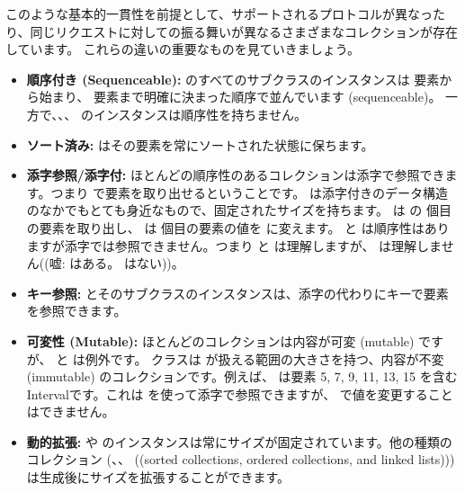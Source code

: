 \documentclass[a4paper,10pt,twoside]{book}
\begin{document}
このような基本的一貫性を前提として、サポートされるプロトコルが異なったり、同じリクエストに対しての振る舞いが異なるさまざまなコレクションが存在しています。
これらの違いの重要なものを見ていきましょう。

\begin{itemize}
  \item {\bf 順序付き (Sequenceable):}
   のすべてのサブクラスのインスタンスは  要素から始まり、 要素まで明確に決まった順序で並んでいます (sequenceable)。
  一方で、\mbox{、}\mbox{、} のインスタンスは順序性を持ちません。

  \item {\bf ソート済み:}
   はその要素を常にソートされた状態に保ちます。

  \item {\bf 添字参照/添字付:}
        ほとんどの順序性のあるコレクションは添字で参照できます。つまり  で要素を取り出せるということです。
         は添字付きのデータ構造のなかでもとても身近なもので、固定されたサイズを持ちます。 は  の  個目の要素を取り出し、 は  個目の要素の値を  に変えます。
         と  は順序性はありますが添字では参照できません。つまり  と  は理解しますが、 は理解しません((嘘:  はある。 はない))。

  \item {\bf キー参照:}
	 とそのサブクラスのインスタンスは、添字の代わりにキーで要素を参照できます。

  \item {\bf 可変性 (Mutable):}
        ほとんどのコレクションは内容が可変 (mutable) ですが、 と  は例外です。
         クラスは  が扱える範囲の大きさを持つ、内容が不変 (immutable) のコレクションです。例えば、 は要素 5, 7, 9, 11, 13, 15 を含むIntervalです。これは  を使って添字で参照できますが、 で値を変更することはできません。

  \item {\bf 動的拡張:}
          や  のインスタンスは常にサイズが固定されています。他の種類のコレクション (、、 ((sorted collections, ordered collections, and linked lists))) は生成後にサイズを拡張することができます。


\end{itemize}
\end{document}

